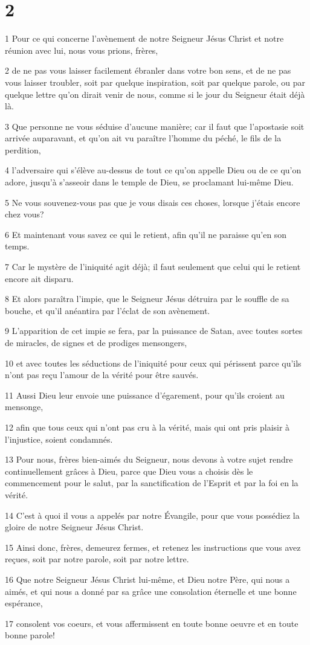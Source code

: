 \chapter{2}

\par 1 Pour ce qui concerne l'avènement de notre Seigneur Jésus Christ et notre réunion avec lui, nous vous prions, frères,
\par 2 de ne pas vous laisser facilement ébranler dans votre bon sens, et de ne pas vous laisser troubler, soit par quelque inspiration, soit par quelque parole, ou par quelque lettre qu'on dirait venir de nous, comme si le jour du Seigneur était déjà là.
\par 3 Que personne ne vous séduise d'aucune manière; car il faut que l'apostasie soit arrivée auparavant, et qu'on ait vu paraître l'homme du péché, le fils de la perdition,
\par 4 l'adversaire qui s'élève au-dessus de tout ce qu'on appelle Dieu ou de ce qu'on adore, jusqu'à s'asseoir dans le temple de Dieu, se proclamant lui-même Dieu.
\par 5 Ne vous souvenez-vous pas que je vous disais ces choses, lorsque j'étais encore chez vous?
\par 6 Et maintenant vous savez ce qui le retient, afin qu'il ne paraisse qu'en son temps.
\par 7 Car le mystère de l'iniquité agit déjà; il faut seulement que celui qui le retient encore ait disparu.
\par 8 Et alors paraîtra l'impie, que le Seigneur Jésus détruira par le souffle de sa bouche, et qu'il anéantira par l'éclat de son avènement.
\par 9 L'apparition de cet impie se fera, par la puissance de Satan, avec toutes sortes de miracles, de signes et de prodiges mensongers,
\par 10 et avec toutes les séductions de l'iniquité pour ceux qui périssent parce qu'ils n'ont pas reçu l'amour de la vérité pour être sauvés.
\par 11 Aussi Dieu leur envoie une puissance d'égarement, pour qu'ils croient au mensonge,
\par 12 afin que tous ceux qui n'ont pas cru à la vérité, mais qui ont pris plaisir à l'injustice, soient condamnés.
\par 13 Pour nous, frères bien-aimés du Seigneur, nous devons à votre sujet rendre continuellement grâces à Dieu, parce que Dieu vous a choisis dès le commencement pour le salut, par la sanctification de l'Esprit et par la foi en la vérité.
\par 14 C'est à quoi il vous a appelés par notre Évangile, pour que vous possédiez la gloire de notre Seigneur Jésus Christ.
\par 15 Ainsi donc, frères, demeurez fermes, et retenez les instructions que vous avez reçues, soit par notre parole, soit par notre lettre.
\par 16 Que notre Seigneur Jésus Christ lui-même, et Dieu notre Père, qui nous a aimés, et qui nous a donné par sa grâce une consolation éternelle et une bonne espérance,
\par 17 consolent vos coeurs, et vous affermissent en toute bonne oeuvre et en toute bonne parole!

